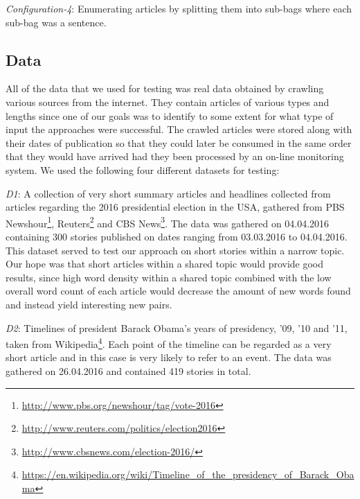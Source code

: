 \emph{Configuration-4}: Enumerating articles by splitting them into sub-bags where each sub-bag was a sentence.



\subsection{Data}
All of the data that we used for testing was real data obtained by crawling various sources from the internet. They contain articles of various types and lengths since one of our goals was to identify to some extent for what type of input the approaches were successful. The crawled articles were stored along with their dates of publication so that they could later be consumed in the same order that they would have arrived had they been processed by an on-line monitoring system. We used the following four different datasets for testing:

\emph{D1}: A collection of very short summary articles and headlines collected from articles regarding the 2016 presidential election in the USA, gathered from PBS Newshour\footnote{\url{http://www.pbs.org/newshour/tag/vote-2016}}, Reuters\footnote{\url{http://www.reuters.com/politics/election2016}} and CBS News\footnote{\url{http://www.cbsnews.com/election-2016/}}. The data was gathered on 04.04.2016 containing 300 stories published on dates ranging from 03.03.2016 to 04.04.2016. This dataset served to test our approach on short stories within a narrow topic. Our hope was that short articles within a shared topic would provide good results, since high word density within a shared topic combined with the low overall word count of each article would decrease the amount of new words found and instead yield interesting new pairs.

\emph{D2}: Timelines of president Barack Obama's years of presidency, '09, '10 and '11, taken from Wikipedia\footnote{\url{https://en.wikipedia.org/wiki/Timeline_of_the_presidency_of_Barack_Obama}}. Each point of the timeline can be regarded as a very short article and in this case is very likely to refer to an event. The data was gathered on 26.04.2016 and contained 419 stories in total.

